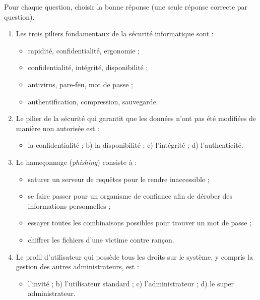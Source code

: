 \documentclass[11pt]{article}
\begin{document}
\begin{exercice}
Pour chaque question, choisir la bonne réponse (une seule réponse correcte par question).
\begin{enumerate}
\item Les trois piliers fondamentaux de la sécurité informatique sont :
\begin{itemize}
\item[a)] rapidité, confidentialité, ergonomie ;
\item[b)] confidentialité, intégrité, disponibilité ;
\item[c)] antivirus, pare-feu, mot de passe ;
\item[d)] authentification, compression, sauvegarde.
\end{itemize}
\item Le pilier de la sécurité qui garantit que les données n'ont pas été modifiées de manière non autorisée est :
\begin{itemize}
\item[a)] la confidentialité ; \quad b) la disponibilité ; \quad c) l'intégrité ; \quad d) l'authenticité.
\end{itemize}
\item Le hameçonnage (\emph{phishing}) consiste à :
\begin{itemize}
\item[a)] saturer un serveur de requêtes pour le rendre inaccessible ;
\item[b)] se faire passer pour un organisme de confiance afin de dérober des informations personnelles ;
\item[c)] essayer toutes les combinaisons possibles pour trouver un mot de passe ;
\item[d)] chiffrer les fichiers d'une victime contre rançon.
\end{itemize}
\item Le profil d'utilisateur qui possède tous les droits sur le système, y compris la gestion des autres administrateurs, est :
\begin{itemize}
\item[a)] l'invité ; \quad b) l'utilisateur standard ; \quad c) l'administrateur ; \quad d) le super administrateur.
\end{itemize}
\end{enumerate}
\end{exercice}
\end{document}
